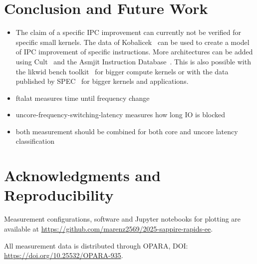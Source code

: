 \chapter{Conclusion and Future Work}
\label{sec:summary}

\begin{itemize}
    \item The claim of a specific IPC improvement can currently not be verified for specific small kernels.
    The data of Kobalicek~\cite{Kobalicek_AsmGrid} can be used to create a model of IPC improvement of specific instructions.
    More architectures can be added using Cult~\cite{Kobalicek_Cult} and the Asmjit Instruction Database~\cite{Kobalicek_InstructionDB}.
    This is also possible with the likwid bench toolkit~\cite{RHZE_HPC_likwid} for bigger compute kernels or with the data published by SPEC~\cite{spec} for bigger kernels and applications.
    \item ftalat measures time until frequency change
    \item uncore-frequency-switching-latency measures how long IO is blocked
    \item both measurement should be combined for both core and uncore latency classification
\end{itemize}

\chapter*{Acknowledgments and Reproducibility}
Measurement configurations, software and Jupyter notebooks for plotting are available at \url{https://github.com/marenz2569/2025-sappire-rapids-ee}.

All measurement data is distributed through OPARA, DOI: \url{https://doi.org/10.25532/OPARA-935}.
